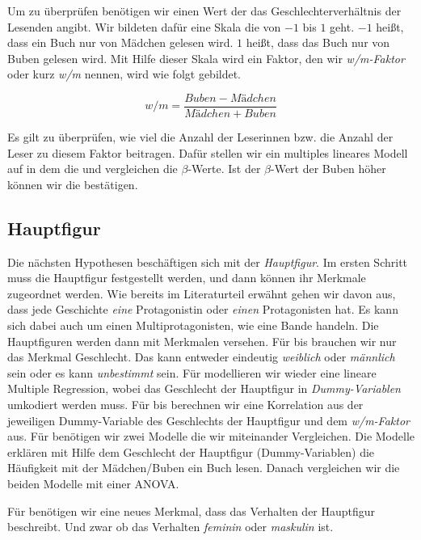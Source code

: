 Um  zu überprüfen benötigen wir einen Wert der das
Geschlechterverhältnis der Lesenden angibt. Wir bildeten dafür eine
Skala die von $-1$ bis $1$ geht. $-1$ heißt, dass ein Buch nur von
Mädchen gelesen wird. $1$ heißt, dass das Buch nur von Buben gelesen
wird. Mit Hilfe dieser Skala wird ein Faktor, den wir \emph{w/m-Faktor}
oder kurz \emph{w/m} nennen, wird wie folgt gebildet.

\begin{equation}
    w/m=\frac{Buben-Mädchen}{Mädchen+Buben}
\end{equation}

Es gilt zu überprüfen, wie viel die Anzahl der Leserinnen bzw. die
Anzahl der Leser zu diesem Faktor beitragen. Dafür stellen wir ein
multiples lineares Modell auf in dem die und vergleichen die
$\beta$-Werte. Ist der $\beta$-Wert der Buben höher können wir die
 bestätigen.

\subsection{Hauptfigur}

Die nächsten Hypothesen beschäftigen sich mit der \emph{Hauptfigur}. Im
ersten Schritt muss die Hauptfigur festgestellt werden, und dann können
ihr Merkmale zugeordnet werden. Wie bereits im Literaturteil erwähnt
gehen wir davon aus, dass jede Geschichte \emph{eine} Protagonistin oder
\emph{einen} Protagonisten hat. Es kann sich dabei auch um einen
Multiprotagonisten, wie \zB eine Bande handeln. Die Hauptfiguren werden
dann mit Merkmalen versehen. Für  bis 
brauchen wir nur das Merkmal Geschlecht. Das kann entweder eindeutig
\emph{weiblich} oder \emph{männlich} sein oder es kann \emph{unbestimmt}
sein. Für  modellieren wir wieder eine lineare Multiple
Regression, wobei das Geschlecht der Hauptfigur in
\emph{Dummy-Variablen} umkodiert werden muss. Für  bis
 berechnen wir eine Korrelation aus der jeweiligen
Dummy-Variable des Geschlechts der Hauptfigur und dem \emph{w/m-Faktor}
aus. Für  benötigen wir zwei Modelle die wir miteinander
Vergleichen. Die Modelle erklären mit Hilfe dem Geschlecht der
Hauptfigur (Dummy-Variablen) die Häufigkeit mit der Mädchen/Buben ein
Buch lesen. Danach vergleichen wir die beiden Modelle mit einer ANOVA.

Für  benötigen wir eine neues Merkmal, dass das Verhalten
der Hauptfigur beschreibt. Und zwar ob das Verhalten \emph{feminin} oder
\emph{maskulin} ist.

